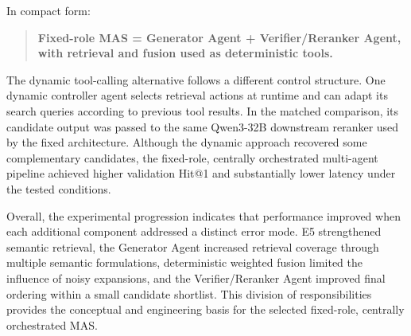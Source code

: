 In compact form:

\begin{quote}
\textbf{Fixed-role MAS = Generator Agent + Verifier/Reranker Agent, with retrieval and fusion used as deterministic tools.}
\end{quote}

The dynamic tool-calling alternative follows a different control structure. One dynamic controller agent selects retrieval actions at runtime and can adapt its search queries according to previous tool results. In the matched comparison, its candidate output was passed to the same Qwen3-32B downstream reranker used by the fixed architecture. Although the dynamic approach recovered some complementary candidates, the fixed-role, centrally orchestrated multi-agent pipeline achieved higher validation Hit@1 and substantially lower latency under the tested conditions.

Overall, the experimental progression indicates that performance improved when each additional component addressed a distinct error mode. E5 strengthened semantic retrieval, the Generator Agent increased retrieval coverage through multiple semantic formulations, deterministic weighted fusion limited the influence of noisy expansions, and the Verifier/Reranker Agent improved final ordering within a small candidate shortlist. This division of responsibilities provides the conceptual and engineering basis for the selected fixed-role, centrally orchestrated MAS.
